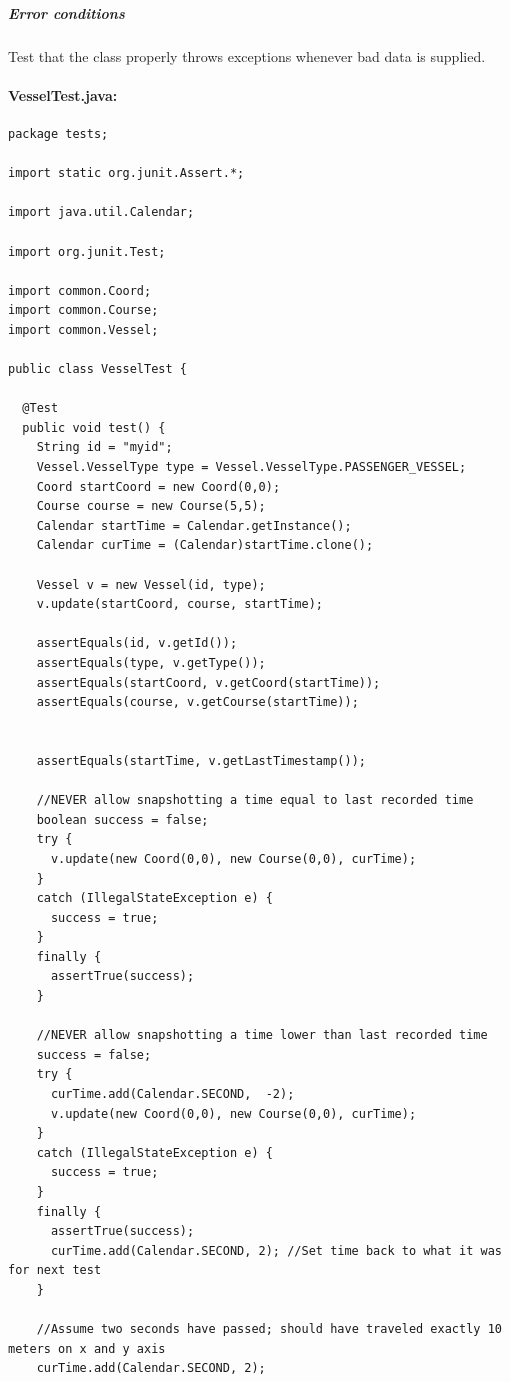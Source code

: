 \documentclass{article}
\begin{document}
\subparagraph{Error conditions \\}
Test that the class properly throws exceptions whenever bad data is supplied.

\paragraph{VesselTest.java:}

\linespread{1.0}
\begin{verbatim}
package tests;

import static org.junit.Assert.*;

import java.util.Calendar;

import org.junit.Test;

import common.Coord;
import common.Course;
import common.Vessel;

public class VesselTest {

  @Test
  public void test() {
    String id = "myid";
    Vessel.VesselType type = Vessel.VesselType.PASSENGER_VESSEL;
    Coord startCoord = new Coord(0,0);
    Course course = new Course(5,5);
    Calendar startTime = Calendar.getInstance();
    Calendar curTime = (Calendar)startTime.clone();
    
    Vessel v = new Vessel(id, type);
    v.update(startCoord, course, startTime);
    
    assertEquals(id, v.getId());
    assertEquals(type, v.getType());
    assertEquals(startCoord, v.getCoord(startTime));
    assertEquals(course, v.getCourse(startTime));
    
    
    assertEquals(startTime, v.getLastTimestamp());
    
    //NEVER allow snapshotting a time equal to last recorded time
    boolean success = false;
    try {
      v.update(new Coord(0,0), new Course(0,0), curTime);
    }
    catch (IllegalStateException e) {
      success = true;
    }
    finally {
      assertTrue(success);
    }
    
    //NEVER allow snapshotting a time lower than last recorded time
    success = false;
    try {
      curTime.add(Calendar.SECOND,  -2);
      v.update(new Coord(0,0), new Course(0,0), curTime);
    }
    catch (IllegalStateException e) {
      success = true;
    }
    finally {
      assertTrue(success);
      curTime.add(Calendar.SECOND, 2); //Set time back to what it was for next test
    }
    
    //Assume two seconds have passed; should have traveled exactly 10 meters on x and y axis
    curTime.add(Calendar.SECOND, 2);
    

\end{verbatim}
\end{document}
